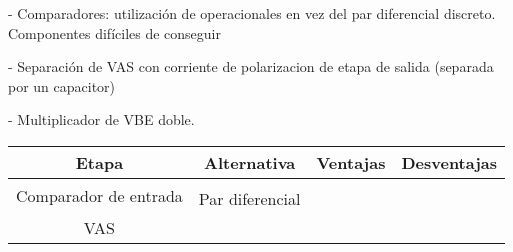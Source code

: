 - Comparadores: utilización de operacionales en vez del par diferencial discreto. Componentes difíciles de conseguir

- Separación de VAS con corriente de polarizacion de etapa de salida (separada por un capacitor)

- Multiplicador de VBE doble.


\begin{table}[h!]
	\centering
	\begin{tabular}{*{4}{c}}
		\toprule
		Etapa                                  & Alternativa & Ventajas & Desventajas \\ 
		\midrule
		\multirow{2}{*}{Comparador de entrada} &             &          &             \\ %
&\cellcolor[HTML]{FFFE65} Par diferencial             &          &             \\
		\midrule
		\multirow{2}{*}{VAS} &             &          &             \\ %
		                                       &             &          &             \\
		\bottomrule
	\end{tabular}
\end{table}

